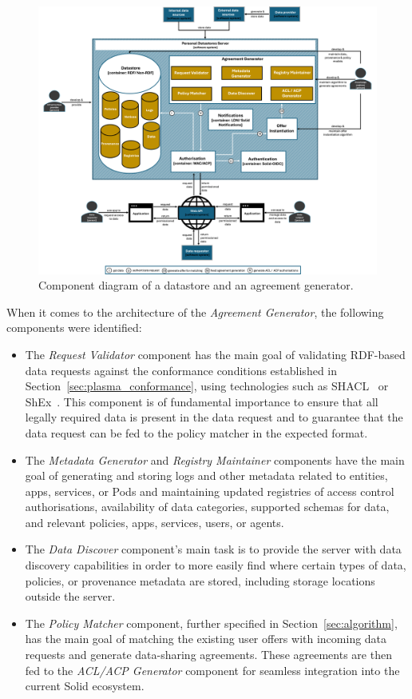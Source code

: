 \begin{figure}[t]
    \centering
    \includegraphics[width=1.1\linewidth]{figures//chapter-6/component.png}
    \caption{Component diagram of a datastore and an agreement generator.}
    \label{fig:c4-component}
\end{figure}

When it comes to the architecture of the \textit{Agreement Generator}, the following components were identified:

\begin{itemize}
    \item The \textit{Request Validator} component has the main goal of validating RDF-based data requests against the conformance conditions established in Section~\ref{sec:plasma_conformance}, using technologies such as SHACL~\citep{knublauch_shapes_2017} or ShEx~\citep{prudhommeaux_shape_2019}. This component is of fundamental importance to ensure that all legally required data is present in the data request and to guarantee that the data request can be fed to the policy matcher in the expected format.
    \item The \textit{Metadata Generator} and \textit{Registry Maintainer} components have the main goal of generating and storing logs and other metadata related to entities, apps, services, or Pods and maintaining updated registries of access control authorisations, availability of data categories, supported schemas for data, and relevant policies, apps, services, users, or agents.
    \item The \textit{Data Discover} component's main task is to provide the server with data discovery capabilities in order to more easily find where certain types of data, policies, or provenance metadata are stored, including storage locations outside the server.
    \item The \textit{Policy Matcher} component, further specified in Section~\ref{sec:algorithm}, has the main goal of matching the existing user offers with incoming data requests and generate data-sharing agreements. These agreements are then fed to the \textit{ACL/ACP Generator} component for seamless integration into the current Solid ecosystem.
\end{itemize}
